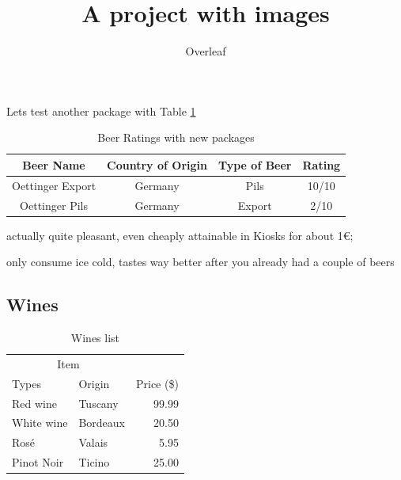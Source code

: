 \documentclass{article}
\begin{document}
\par
Lets test another package with Table \ref{table:2}
\begin{table}[h]
\begin{center}
\begin{threeparttable}
\begin{tabular}{c c c c}
    \toprule
    \textbf{Beer Name} & \textbf{Country of Origin} & \textbf{Type of Beer} & \textbf{Rating} \\ 
    \midrule
      Oettinger Export\tnote{1}   & Germany & Pils & 10/10 \\
      Oettinger Pils\tnote{2}   & Germany & Export & 2/10 \\ 
      \bottomrule
\end{tabular}
\begin{tablenotes}
\item[1] actually quite pleasant, even cheaply attainable in Kiosks for about 1€; \item[2] only consume ice cold, tastes way better after you already had a couple of beers
\end{tablenotes}
\end{threeparttable}
\end{center}
\caption{Beer Ratings with new packages}{}
\label{table:2}
\end{table}

\newpage
\subsection{Wines }
\begin{table}[h]
\centering
\begin{tabular}{llr}
\hline
\multicolumn{2}{c}{Item} \\
\cline{1-2}
Types    & Origin & Price (\$) \\
\hline
Red wine      & Tuscany     & 99.99      \\
White wine       & Bordeaux     & 20.50      \\
Rosé       & Valais     & 5.95      \\
Pinot Noir & Ticino      & 25.00       \\
\hline
\end{tabular}
\caption{Wines list}
 \label{table:3}
\end{table}

\title{A project with images}
\author{Overleaf}
\date{}
\end{document}
